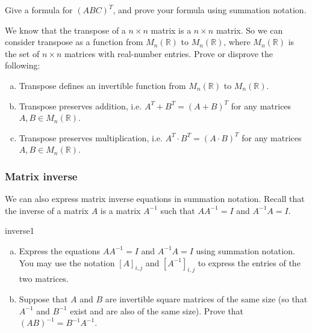 \begin{exercise}{}
Give a formula for $(ABC)^T$, and prove your formula using summation notation.
\end{exercise}

\begin{exercise}{}
We know that the transpose of a $n \times n$ matrix is a $n \times n$ matrix.  So we can consider transpose as a function from $M_n(\mathbb{R})$ to $M_n(\mathbb{R})$, where   $M_n(\mathbb{R})$  is the set of $n \times n$ matrices with real-number entries. Prove or disprove the following:
\begin{enumerate}[(a)]
\item
Transpose defines an invertible function from $M_n(\mathbb{R})$ to $M_n(\mathbb{R})$.
\item
Transpose preserves addition, i.e. $A^T + B^T = (A+B)^T$ for any matrices $A,B \in M_n(\mathbb{R})$.
\item
Transpose preserves multiplication, i.e. $A^T \cdot B^T = (A\cdot B)^T$ for any matrices $A,B \in M_n(\mathbb{R})$.

\end{enumerate}
\end{exercise}



\subsubsection*{Matrix inverse}

We can also express matrix inverse equations in summation notation.  Recall that the inverse of a matrix $A$ is a matrix $A^{-1}$ such that $AA^{-1}=I$ and $A^{-1}A=I$.

\begin{exercise}{inverse1}
\begin{enumerate}[(a)]
\item
Express the equations $AA^{-1}=I$ and $A^{-1}A=I$ using summation notation.  You may use the notation $[A]_{i,j}$ and $[A^{-1}]_{i,j}$ to express the entries of the two matrices.
\item
Suppose that $A$ and $B$ are invertible square matrices of the same size (so that $A^{-1}$ and $B^{-1}$ exist and are also of the same size). Prove that $(AB)^{-1} = B^{-1}A^{-1}$.
\end{enumerate}
\end{exercise}

